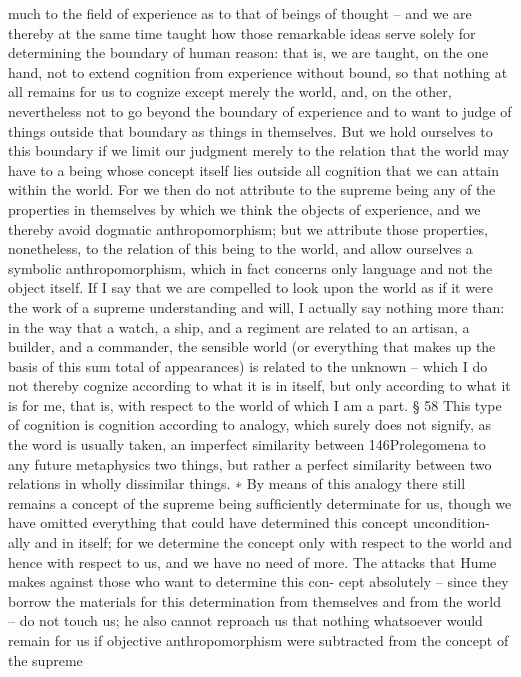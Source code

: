much to the ﬁeld of experience as to that of beings of thought – and we
are thereby at the same time taught how those remarkable ideas serve
solely for determining the boundary of human reason: that is, we are
taught, on the one hand, not to extend cognition from experience without
bound, so that nothing at all remains for us to cognize except merely the
world, and, on the other, nevertheless not to go beyond the boundary
of experience and to want to judge of things outside that boundary as
things in themselves.
But we hold ourselves to this boundary if we limit our judgment
merely to the relation that the world may have to a being whose concept
itself lies outside all cognition that we can attain within the world. For
we then do not attribute to the supreme being any of the properties in
themselves by which we think the objects of experience, and we thereby
avoid dogmatic anthropomorphism; but we attribute those properties,
nonetheless, to the relation of this being to the world, and allow ourselves
a symbolic anthropomorphism, which in fact concerns only language and
not the object itself.
If I say that we are compelled to look upon the world as if it were the
work of a supreme understanding and will, I actually say nothing more
than: in the way that a watch, a ship, and a regiment are related to an
artisan, a builder, and a commander, the sensible world (or everything
that makes up the basis of this sum total of appearances) is related to the
unknown – which I do not thereby cognize according to what it is in
itself, but only according to what it is for me, that is, with respect to the
world of which I am a part.
§ 58
This type of cognition is cognition according to analogy, which surely does
not signify, as the word is usually taken, an imperfect similarity between
146Prolegomena to any future metaphysics
two things, but rather a perfect similarity between two relations in wholly
dissimilar things. ∗ By means of this analogy there still remains a concept
of the supreme being sufﬁciently determinate for us, though we have
omitted everything that could have determined this concept uncondition-
ally and in itself; for we determine the concept only with respect to the
world and hence with respect to us, and we have no need of more. The
attacks that Hume makes against those who want to determine this con-
cept absolutely – since they borrow the materials for this determination
from themselves and from the world – do not touch us; he also cannot
reproach us that nothing whatsoever would remain for us if objective
anthropomorphism were subtracted from the concept of the supreme
